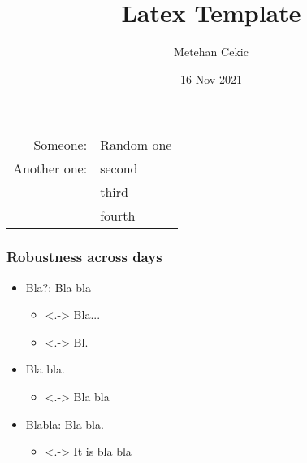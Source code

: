 




\title{Latex Template}
\author[Metehan Cekic]{Metehan Cekic}
\centering
\date[]{16 Nov 2021}

\begin{frame}
  \maketitle

  \begin{table}\centering
  \begin{tabular}{rl}
  Someone: & Random one \\
  Another one: & second \\
               & third \\
               & fourth
  \end{tabular}
  \end{table}
\end{frame}



\begin{frame}\frametitle{Robustness across days}
  \begin{itemize}[<+->]
    \item {\color{DarkRed} Bla?}: Bla bla \vspace{5pt}
    \begin{itemize}
      \item<.-> Bla... \vspace{5pt}
      \item<.-> Bl.
    \end{itemize}
  \end{itemize}
  \begin{itemize}[<+->]
    \item Bla bla. \vspace{5pt}
    \begin{itemize}[<+->]
      \item<.-> Bla bla
      \vspace{5pt}
    \end{itemize} 
    \item {\color{DarkRed} Blabla}: Bla bla.
    \begin{itemize}[<+->]
      \item<.-> It is bla bla
    \end{itemize} 
  \end{itemize}
\end{frame}

